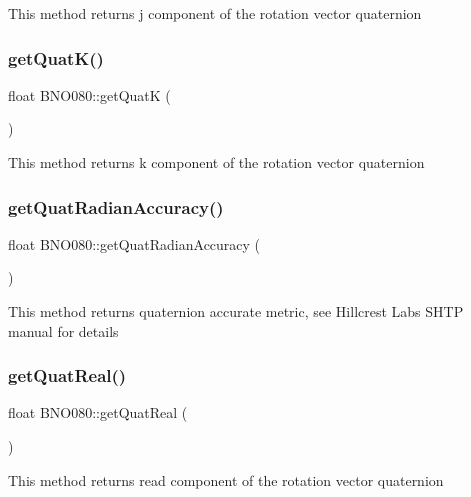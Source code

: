 This method returns j component of the rotation vector quaternion \mbox{\label{classBNO080_abeb09e3600b140d7447d9e6a9ac81ad8}} 
\subsubsection{\texorpdfstring{getQuatK()}{getQuatK()}}
{\footnotesize\ttfamily float B\+N\+O080\+::get\+QuatK (\begin{DoxyParamCaption}{ }\end{DoxyParamCaption})}

This method returns k component of the rotation vector quaternion \mbox{\label{classBNO080_a10b5cd695195620c7238cd48a7e366f5}} 
\subsubsection{\texorpdfstring{getQuatRadianAccuracy()}{getQuatRadianAccuracy()}}
{\footnotesize\ttfamily float B\+N\+O080\+::get\+Quat\+Radian\+Accuracy (\begin{DoxyParamCaption}{ }\end{DoxyParamCaption})}

This method returns quaternion accurate metric, see Hillcrest Labs S\+H\+TP manual for details \mbox{\label{classBNO080_a3b0b23d3d061baff2858ffa440bc2b77}} 
\subsubsection{\texorpdfstring{getQuatReal()}{getQuatReal()}}
{\footnotesize\ttfamily float B\+N\+O080\+::get\+Quat\+Real (\begin{DoxyParamCaption}{ }\end{DoxyParamCaption})}

This method returns read component of the rotation vector quaternion \mbox{\label{classBNO080_a9e3c4765c00091b4766699e0d854de80}} 
